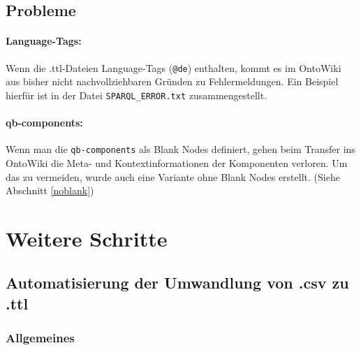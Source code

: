 \documentclass[a4paper,11pt]{article}
\begin{document}
\subsection{Probleme} 
\label{fehler}

\paragraph{Language-Tags:} 
Wenn die .ttl-Dateien Language-Tags (\texttt{@de}) enthalten, kommt es im
OntoWiki aus bisher nicht nachvollziehbaren Gründen zu Fehlermeldungen.  Ein
Beispiel hierfür ist in der Datei \texttt{SPARQL\_ERROR.txt} zusammengestellt.

\paragraph{qb-components:} 
Wenn man die \texttt{qb-components} als Blank Nodes definiert, gehen beim
Transfer ins OntoWiki die Meta- und Kontextinformationen der Komponenten
verloren. Um das zu vermeiden, wurde auch eine Variante ohne Blank Nodes
erstellt. (Siehe Abschnitt \ref{noblank})

\section{Weitere Schritte}

\subsection{Automatisierung der Umwandlung von .csv zu .ttl}
\label{Umwandlung}
\subsubsection{Allgemeines}
\end{document}
